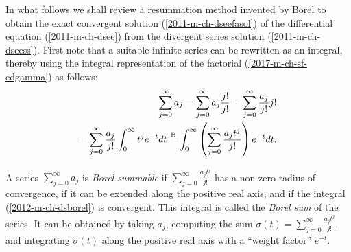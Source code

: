 In what follows we shall review\cite[-50mm]{rousseau-2004}
a resummation method
invented by Borel \cite{Borel1899}
to obtain the exact convergent solution
(\ref{2011-m-ch-dseefasol})
of the differential equation  (\ref{2011-m-ch-dsee})
from the divergent series solution (\ref{2011-m-ch-dseess}).
First note that a suitable infinite series  can be rewritten as an integral,
thereby using the integral representation of the factorial (\ref{2017-m-ch-sf-edgamma})
as follows:
\begin{equation}
\begin{split}
\sum_{j=0}^\infty
a_j
=
\sum_{j=0}^\infty
a_j  \frac{j!}{j!}
=
\sum_{j=0}^\infty
  \frac{a_j}{j!}  j!
\\
=
\sum_{j=0}^\infty
  \frac{a_j}{j!}  \int_0^\infty t^j e^{-t} dt
\stackrel{{\rm B}}{=}
\int_0^\infty \left(\sum_{j=0}^\infty   \frac{a_j t^j}{j!}\right)   e^{-t} dt
.
\end{split}
\label{2012-m-ch-dsborel}
\end{equation}



A series  $\sum_{j=0}^\infty   a_j $
is {\em Borel summable}
if
$\sum_{j=0}^\infty   \frac{a_j t^j}{j!}$ has a non-zero radius of convergence,
if it can be extended along the positive real axis, and if the integral
(\ref{2012-m-ch-dsborel}) is convergent.
This integral is called the
{\em Borel sum}
of the series.
It can be obtained by taking $a_j$, computing the sum $\sigma (t) = \sum_{j=0}^\infty   \frac{a_j t^j}{j!}$,
and integrating $\sigma (t)$ along the positive real axis with a ``weight factor'' $e^{-t}$.


